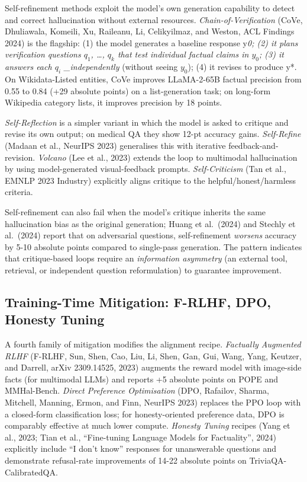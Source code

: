 \documentclass{article}
\begin{document}
Self-refinement methods exploit the model's own generation capability to detect and correct hallucination without external resources. \emph{Chain-of-Verification} (CoVe, Dhuliawala, Komeili, Xu, Raileanu, Li, Celikyilmaz, and Weston, ACL Findings 2024) is the flagship: (1) the model generates a baseline response y\emph{0; (2) it plans verification questions \(q_1\), \ldots, \(q_k\) that test individual factual claims in \(y_0\); (3) it answers each \(q_i\) \_independently} (without seeing \(y_0\)); (4) it revises to produce y*. On Wikidata-Listed entities, CoVe improves LLaMA-2-65B factual precision from 0.55 to 0.84 (+29 absolute points) on a list-generation task; on long-form Wikipedia category lists, it improves precision by 18 points.

\emph{Self-Reflection} \citep{ji2023surveyofhallucinat} is a simpler variant in which the model is asked to critique and revise its own output; on medical QA they show 12-pt accuracy gains. \emph{Self-Refine} (Madaan et al., NeurIPS 2023) generalises this with iterative feedback-and-revision. \emph{Volcano} (Lee et al., 2023) extends the loop to multimodal hallucination by using model-generated visual-feedback prompts. \emph{Self-Criticism} (Tan et al., EMNLP 2023 Industry) explicitly aligns critique to the helpful/honest/harmless criteria.

Self-refinement can also fail when the model's critique inherits the same hallucination bias as the original generation; Huang et al.~(2024) and Stechly et al.~(2024) report that on adversarial questions, self-refinement \emph{worsens} accuracy by 5-10 absolute points compared to single-pass generation. The pattern indicates that critique-based loops require an \emph{information asymmetry} (an external tool, retrieval, or independent question reformulation) to guarantee improvement.

\subsection{Training-Time Mitigation: F-RLHF, DPO, Honesty Tuning}\label{training-time-mitigation-f-rlhf-dpo-honesty-tuning}

A fourth family of mitigation modifies the alignment recipe. \emph{Factually Augmented RLHF} (F-RLHF, Sun, Shen, Cao, Liu, Li, Shen, Gan, Gui, Wang, Yang, Keutzer, and Darrell, arXiv 2309.14525, 2023) augments the reward model with image-side facts (for multimodal LLMs) and reports +5 absolute points on POPE and MMHal-Bench. \emph{Direct Preference Optimisation} (DPO, Rafailov, Sharma, Mitchell, Manning, Ermon, and Finn, NeurIPS 2023) replaces the PPO loop with a closed-form classification loss; for honesty-oriented preference data, DPO is comparably effective at much lower compute. \emph{Honesty Tuning} recipes (Yang et al., 2023; Tian et al., ``Fine-tuning Language Models for Factuality'', 2024) explicitly include ``I don't know'' responses for unanswerable questions and demonstrate refusal-rate improvements of 14-22 absolute points on TriviaQA-CalibratedQA.
\end{document}
